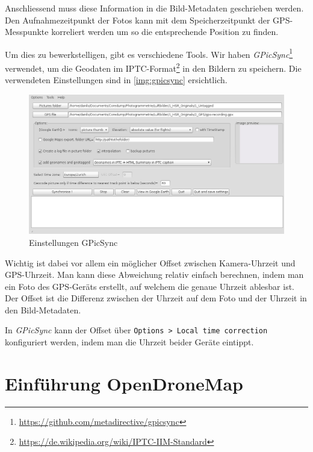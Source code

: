 Anschliessend muss diese Information in die Bild-Metadaten geschrieben werden.
Den Aufnahmezeitpunkt der Fotos kann mit dem Speicherzeitpunkt der
GPS-Messpunkte korreliert werden um so die entsprechende Position zu finden.

Um dies zu bewerkstelligen, gibt es verschiedene Tools. Wir haben
\textit{GPicSync}\footnote{\url{https://github.com/metadirective/gpicsync}} verwendet,
um die Geodaten im
IPTC-Format\footnote{\url{https://de.wikipedia.org/wiki/IPTC-IIM-Standard}} in
den Bildern zu speichern. Die verwendeten Einstellungen sind in
\autoref{img:gpicsync} ersichtlich.

\begin{figure}[h!]
	\centering
	\includegraphics[width=\textwidth]{images/gpicsync}
	\caption{Einstellungen GPicSync}
	\label{img:gpicsync}
\end{figure}

Wichtig ist dabei vor allem ein möglicher Offset zwischen Kamera-Uhrzeit und
GPS-Uhrzeit. Man kann diese Abweichung relativ einfach berechnen, indem man ein
Foto des GPS-Geräts erstellt, auf welchem die genaue Uhrzeit ablesbar ist.
Der Offset ist die Differenz zwischen der Uhrzeit auf dem Foto und der Uhrzeit
in den Bild-Metadaten.

In \textit{GPicSync} kann der Offset über \texttt{Options > Local time
correction} konfiguriert werden, indem man die Uhrzeit beider Geräte eintippt.


\section{Einführung OpenDroneMap}

\label{opendronemap}

